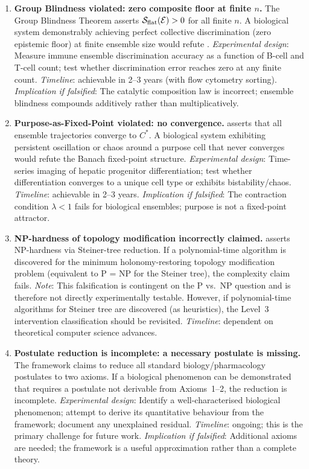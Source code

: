 \begin{enumerate}[label=\textbf{F\arabic*.}, leftmargin=3em]
\item \textbf{Group Blindness violated: zero composite floor at finite $n$.}
  The Group Blindness Theorem asserts $\mathcal{S}_{\mathrm{flat}}(\mathcal{E}) > 0$ for
  all finite $n$.  A biological system demonstrably achieving perfect
  collective discrimination (zero epistemic floor) at finite ensemble size
  would refute .
  \emph{Experimental design}: Measure immune ensemble discrimination accuracy
  as a function of B-cell and T-cell count; test whether discrimination error
  reaches zero at any finite count.
  \emph{Timeline}: achievable in 2--3 years (with flow cytometry sorting).
  \emph{Implication if falsified}: The catalytic composition law is incorrect;
  ensemble blindness compounds additively rather than multiplicatively.

\item \textbf{Purpose-as-Fixed-Point violated: no convergence.}
   asserts that all ensemble trajectories converge
  to $C^*$.  A biological system exhibiting persistent oscillation or chaos
  around a purpose cell that never converges would refute the Banach fixed-point
  structure.
  \emph{Experimental design}: Time-series imaging of hepatic progenitor
  differentiation; test whether differentiation converges to a unique cell
  type or exhibits bistability/chaos.
  \emph{Timeline}: achievable in 2--3 years.
  \emph{Implication if falsified}: The contraction condition $\lambda < 1$
  fails for biological ensembles; purpose is not a fixed-point attractor.

\item \textbf{NP-hardness of topology modification incorrectly claimed.}
   asserts NP-hardness via Steiner-tree reduction.
  If a polynomial-time algorithm is discovered for the minimum holonomy-restoring
  topology modification problem (equivalent to P = NP for the Steiner tree),
  the complexity claim fails.
  \emph{Note}: This falsification is contingent on the P vs.\ NP question
  and is therefore not directly experimentally testable.  However, if
  polynomial-time algorithms for Steiner tree are discovered (as heuristics),
  the Level~3 intervention classification should be revisited.
  \emph{Timeline}: dependent on theoretical computer science advances.

\item \textbf{Postulate reduction is incomplete: a necessary postulate is missing.}
  The framework claims to reduce all standard biology/pharmacology postulates
  to two axioms.  If a biological phenomenon can be demonstrated that
  requires a postulate not derivable from Axioms~1--2, the reduction is
  incomplete.
  \emph{Experimental design}: Identify a well-characterised biological
  phenomenon; attempt to derive its quantitative behaviour from the framework;
  document any unexplained residual.
  \emph{Timeline}: ongoing; this is the primary challenge for future work.
  \emph{Implication if falsified}: Additional axioms are needed; the framework
  is a useful approximation rather than a complete theory.

\end{enumerate}


